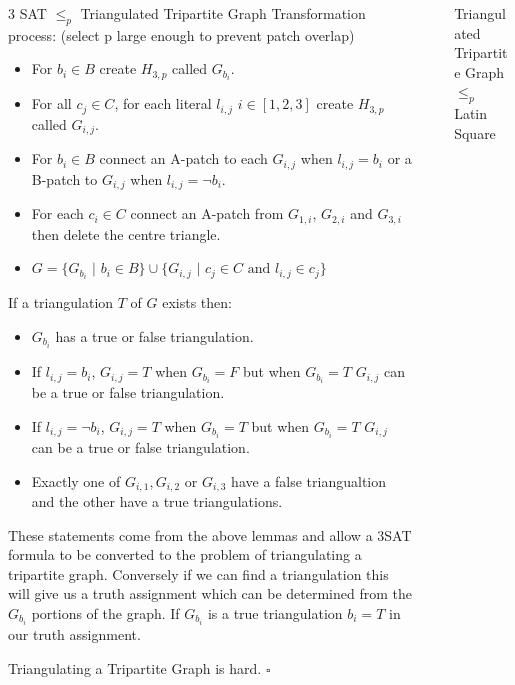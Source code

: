 \documentclass[final]{beamer}
\newlength{\sepwidth}
\newlength{\colwidth}
\newcounter{col}
\newcommand{\separatorcolumn}{\begin{column}{\sepwidth}\end{column}}
\begin{document}
\begin{frame}[t]
\begin{columns}[t]
\begin{column}{\colwidth}
\begin{block}{3 SAT $\leq_p$ Triangulated Tripartite Graph \cite{doi:10.1137/0210054}}
Transformation process: (select p large enough to prevent patch overlap)
\begin{itemize}
\item For $b_i\in B$ create $H_{3,p}$ called $G_{b_i}$.
\item For all $c_j\in C$, for each literal $l_{i,j}$ $i\in [1,2,3]$ create $H_{3,p}$ called $G_{i,j}$.
\item For $b_i \in B$ connect an A-patch to each $G_{i,j}$ when $l_{i,j}=b_i$ or a B-patch to $G_{i,j}$ when $l_{i,j}=\neg b_i$. 
\item For each $c_i\in C$ connect an A-patch from $G_{1,i}$, $G_{2,i}$ and $G_{3,i}$ then delete the centre triangle. 
\item $G = \{G_{b_i}$ $|$ $b_i \in B\}\cup\{G_{i,j}$ $|$ $ c_j\in C\text{ and }l_{i,j}\in c_j \}$
\end{itemize}

If a triangulation $T$ of $G$ exists then: 
\begin{itemize}
\item $G_{b_i}$ has a true or false triangulation. 
\item If $l_{i,j}=b_i$, $G_{i,j}= T$ when $G_{b_i}=F$ but when $G_{b_i}=T$ $G_{i,j}$ can be a true or false triangulation. 
\item If $l_{i,j}=\neg b_i$, $G_{i,j}= T$ when $G_{b_i}=T$ but when $G_{b_i}=T$ $G_{i,j}$ can be a true or false triangulation. 
\item Exactly one of $G_{i,1}, G_{i,2}$ or $G_{i,3}$ have a false triangualtion and the other have a true triangulations.
\end{itemize}

These statements come from the above lemmas and allow a 3SAT formula to be converted to the problem of triangulating a tripartite graph. Conversely if we can find a triangulation this will give us a truth assignment which can be determined from the $G_{b_i}$ portions of the graph. If $G_{b_i}$ is a true triangulation $b_i = T$ in our truth assignment. 

Triangulating a Tripartite Graph is hard. $\square$
  \end{block}

\end{column}

\separatorcolumn
\begin{column}{\colwidth}
 
  \begin{block}{Triangulated Tripartite Graph $\leq_p$ Latin Square \cite{COLBOURN198425}}


\end{block}
\end{column}
\end{columns}
\end{frame}
\end{document}
